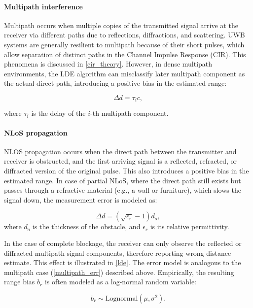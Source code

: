 \paragraph{Multipath interference}

Multipath occurs when multiple copies of the transmitted signal arrive at the receiver via different paths due to reflections, diffractions, and scattering. UWB systems are generally resilient to multipath because of their short pulses, which allow separation of distinct paths in the Channel Impulse Response (CIR). This phenomena is discussed in \autoref{cir_theory}. However, in dense multipath environments, the LDE algorithm can misclassify later multipath component as the actual direct path, introducing a positive bias in the estimated range:

\begin{equation}\label{multipath_err}
    \Delta d =  \tau_i c,
\end{equation}

where $\tau_i$ is the delay of the $i$-th multipath component.

\paragraph{NLoS propagation}

NLOS propagation occurs when the direct path between the transmitter and receiver is obstructed, and the first arriving signal is a reflected, refracted, or diffracted version of the original pulse. This also introduces a positive bias in the estimated range. In case of partial NLoS, where the direct path still exists but passes through a refractive material (e.g., a wall or furniture), which slows the signal down, the measurement error is modeled as:

\begin{equation}
\Delta d = (\sqrt{\epsilon_r} - 1) d_o,
\end{equation}
where $d_o$ is the thickness of the obstacle, and $\epsilon_r$ is its relative permittivity. 

In the case of complete blockage, the receiver can only observe the reflected or diffracted multipath signal components, therefore reporting wrong distance estimate. This effect is illustrated in \autoref{lde}. The error model is analogous to the multipath case (\autoref{multipath_err}) described above. Empirically, the resulting range bias $b_r$ is often modeled as a log-normal random variable:

\begin{equation}
b_r \sim \text{Lognormal}(\mu, \sigma^2).
\end{equation}

